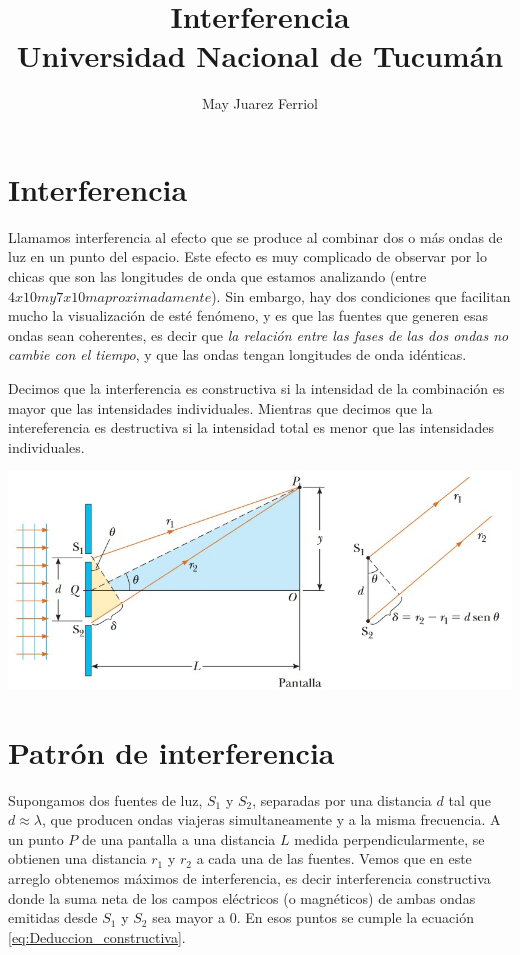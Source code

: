 \documentclass[a4paper,12pt]{article}
\title{ Interferencia \\ 
\medskip \large Universidad Nacional de Tucumán}
\author{May Juarez Ferriol}
\date{}
\newenvironment{Figure}
  {\par\medskip\noindent\minipage{\linewidth}}
  {\endminipage\par\medskip}
\begin{document}
\maketitle

\section*{Interferencia}

    Llamamos interferencia al efecto que se produce al combinar dos o más ondas de luz en un punto del espacio. Este efecto es muy complicado de observar por lo chicas que son las longitudes de onda que estamos analizando (entre $4 x 10 m y 7 x 10 m aproximadamente$). Sin embargo, hay dos condiciones que facilitan mucho la visualización de esté fenómeno, y es que las fuentes que generen esas ondas sean coherentes, es decir que \emph{la relación entre las fases de las dos ondas no cambie con el tiempo}, y que las ondas tengan longitudes de onda idénticas.

    Decimos que la interferencia es constructiva si la intensidad de la combinación es mayor que las intensidades individuales. Mientras que decimos que la intereferencia es destructiva si la intensidad total es menor que las intensidades individuales.

    \begin{Figure}
        \centering
        \includegraphics[width=0.75\linewidth]{DeduccionInterferencia.jpg}
        \label{fig:DeduccionInterferencia}
    \end{Figure}

\section*{Patrón de interferencia}

    Supongamos dos fuentes de luz, $S_1$ y $S_2$, separadas por una distancia $d$ tal que $d \approx \lambda$, que producen ondas viajeras simultaneamente y a la misma frecuencia. A un punto $P$ de una pantalla a una distancia $L$ medida perpendicularmente, se obtienen una distancia $r_1$ y $r_2$ a cada una de las fuentes. Vemos que en este arreglo obtenemos máximos de interferencia, es decir interferencia constructiva donde la suma neta de los campos eléctricos (o magnéticos) de ambas ondas emitidas desde $S_1$ y $S_2$ sea mayor a 0. En esos puntos se cumple la ecuación \ref{eq:Deduccion_constructiva}.
\end{document}
